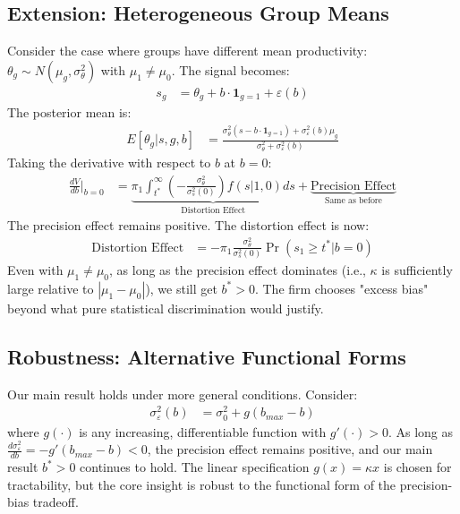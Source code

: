 \subsection{Extension: Heterogeneous Group Means}

Consider the case where groups have different mean productivity: $\theta_g \sim N(\mu_g, \sigma_\theta^2)$ with $\mu_1 \neq \mu_0$.
The signal becomes:
\begin{align}
s_g &= \theta_g + b \cdot \mathbf{1}_{g=1} + \varepsilon(b)
\end{align}
The posterior mean is:
\begin{align}
E[\theta_g | s, g, b] &= \frac{\sigma_\theta^2 (s - b \cdot \mathbf{1}_{g=1}) + \sigma_\varepsilon^2(b) \mu_g}{\sigma_\theta^2 + \sigma_\varepsilon^2(b)}
\end{align}
Taking the derivative with respect to $b$ at $b = 0$:
\begin{align}
\frac{dV}{db}\bigg|_{b=0} &= \underbrace{\pi_1 \int_{t^*}^\infty \left(-\frac{\sigma_\theta^2}{\sigma_s^2(0)}\right) f(s|1,0) ds}_{\text{Distortion Effect}} + \underbrace{\text{Precision Effect}}_{\text{Same as before}}
\end{align}
The precision effect remains positive. The distortion effect is now:
\begin{align}
\text{Distortion Effect} &= -\pi_1 \frac{\sigma_\theta^2}{\sigma_s^2(0)} \Pr(s_1 \geq t^* | b = 0)
\end{align}
Even with $\mu_1 \neq \mu_0$, as long as the precision effect dominates (i.e., $\kappa$ is sufficiently large relative to $|\mu_1 - \mu_0|$), we still get $b^* > 0$. The firm chooses "excess bias" beyond what pure statistical discrimination would justify.

\subsection{Robustness: Alternative Functional Forms}

Our main result holds under more general conditions. Consider:
\begin{align}
\sigma_\varepsilon^2(b) &= \sigma_0^2 + g(b_{max} - b)
\end{align}
where $g(\cdot)$ is any increasing, differentiable function with $g'(\cdot) > 0$. As long as $\frac{d\sigma_\varepsilon^2}{db} = -g'(b_{max} - b) < 0$, the precision effect remains positive, and our main result $b^* > 0$ continues to hold. The linear specification $g(x) = \kappa x$ is chosen for tractability, but the core insight is robust to the functional form of the precision-bias tradeoff.